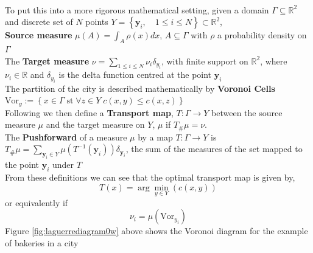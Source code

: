 \\
To put this into a more rigorous mathematical setting, given a domain  $\Gamma\subseteq \mathbb{R}^2$ and discrete set of $N$ points $Y = \left\lbrace \bm{y}_i, \quad 1\leq i \leq N \right\rbrace  \subset \mathbb{R}^2$,\\
\linebreak
\textbf{Source measure} $\mu(A) = \int_A \rho(x)dx$, $A \subseteq \Gamma$ with $\rho$ a probability density on $\Gamma$\\
The \textbf{Target measure} $\nu = \sum_{1\leq i \leq N}\nu_i \delta_{y_i}$, with finite support on $\mathbb{R}^2$, where $\nu_i \in \mathbb{R}$ and $\delta_{y_i}$ is the delta function centred at the point $\bm{y}_i$\\
\linebreak
The partition of the city is described mathematically by \textbf{Voronoi Cells} \\ $\text{Vor}_y := \left\lbrace x \in \Gamma \; \text{st} \; \forall z \in Y \; c(x,y) \leq c(x,z) \right\rbrace$\\
\linebreak
Following \cite{Kitagawa2016} we then define a \textbf{Transport map}, $T: \Gamma \rightarrow Y$ between the source measure $\mu$ and the target measure on $Y$, $\mu$ if $T_{\#}\mu = \nu$.\\
\linebreak
The \textbf{Pushforward} of a measure $\mu$ by a map $T: \Gamma \rightarrow Y$ is $T_{\#}\mu = \sum_{\bm{y}_i \in Y} \mu \left( T^{-1}(\bm{y}_i) \right) \delta_{\bm{y}_i}$, the sum of the measures of the set mapped to the point $\bm{y}_i$ under $T$
\\
From these definitions we can see that the optimal transport map is given by,
\begin{equation}
	T(x) = \arg\min_{y\in Y}\left(c(x,y)\right)
\end{equation}
or equivalently if 
\begin{equation}
\nu_i = \mu\left(\text{Vor}_{y_i}\right)
\end{equation}
Figure \ref{fig:laguerrediagram0w} above shows the Voronoi diagram for the example of bakeries in a city
